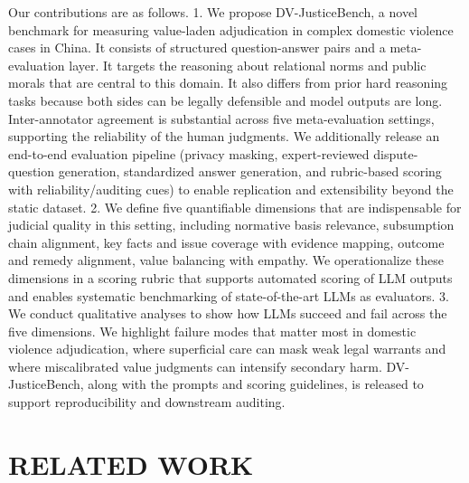 {Our contributions are as follows. 1. We propose DV-JusticeBench, a novel benchmark for measuring value-laden adjudication in complex domestic violence cases in China. It consists of structured question-answer pairs and a meta-evaluation layer. It targets the reasoning about relational norms and public morals that are central to this domain. It also differs from prior hard reasoning tasks because both sides can be legally defensible and model outputs are long. Inter-annotator agreement is substantial across five meta-evaluation settings, supporting the reliability of the human judgments. We additionally release an end-to-end evaluation pipeline (privacy masking, expert-reviewed dispute-question generation, standardized answer generation, and rubric-based scoring with reliability/auditing cues) to enable replication and extensibility beyond the static dataset. 2. We define five quantifiable dimensions that are indispensable for judicial quality in this setting, including normative basis relevance, subsumption chain alignment, key facts and issue coverage with evidence mapping, outcome and remedy alignment, value balancing with empathy. We operationalize these dimensions in a scoring rubric that supports automated scoring of LLM outputs and enables systematic benchmarking of state-of-the-art LLMs as evaluators. 3. We conduct qualitative analyses to show how LLMs succeed and fail across the five dimensions. We highlight failure modes that matter most in domestic violence adjudication, where superficial care can mask weak legal warrants and where miscalibrated value judgments can intensify secondary harm. DV-JusticeBench, along with the prompts and scoring guidelines, is released to support reproducibility and downstream auditing.

\hypertarget{related-work}{%
\section{RELATED WORK}\label{related-work}

}}
